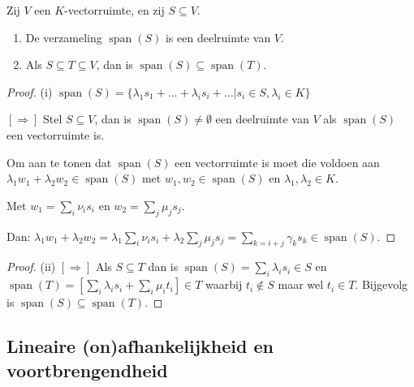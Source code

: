 \begin{lemma}[2.2.9]
    Zij $V$ een $K$-vectorruimte, en zij $S \subseteq V$.
    \begin{enumerate}
        \item[(i)] De verzameling $\operatorname{span}(S)$ is een deelruimte van $V$.
        \item[(ii)] Als $S \subseteq T \subseteq V$, dan is $\operatorname{span}(S) \subseteq \operatorname{span}(T)$.
    \end{enumerate}
\end{lemma}
\begin{proof}(i)
    \(\operatorname{span}(S) = \{\lambda_1s_1+ \dots + \lambda_is_i + \dots |s_i \in S, \lambda_i \in K \}\)

    \([\Rightarrow]\) Stel \(S \subseteq V\), dan is \(\operatorname{span}(S) \neq \emptyset\) een deelruimte van \(V\) als \(\operatorname{span}(S)\) een vectorruimte is.

    Om aan te tonen dat \(\operatorname{span}(S)\) een vectorruimte is moet die voldoen aan \(\lambda_1 w_1 + \lambda_2 w_2 \in \operatorname{span}(S)\) met \(w_1,w_2 \in \operatorname{span}(S) \)
    en \(\lambda_1,\lambda_2 \in K\). 

    Met \(w_1 = \sum_{i} \nu_i s_i\) en \(w_2 = \sum_{j} \mu_j s_j\).

    Dan: 
    \(\lambda_1 w_1 + \lambda_2 w_2 = \lambda_1 \sum_{i} \nu_i s_i + \lambda_2 \sum_{j} \mu_j s_j = \sum_{k=i+j} \gamma_k s_k \in \operatorname{span}(S) \).    
\end{proof}
\begin{proof}(ii)
    \([\Rightarrow]\) Als \(S \subseteq T\) dan is \(\operatorname{span}(S) = \sum_{i} \lambda_i s_i \in S \)
    en \(\operatorname{span}(T) = \left[\sum_{i} \lambda_i s_i + \sum_{i} \mu_i t_i \right] \in T\) 
    waarbij \(t_i \notin S\) maar wel \(t_i \in T\). Bijgevolg is \(\operatorname{span}(S) \subseteq \operatorname{span}(T)\).
\end{proof}

\subsection{Lineaire (on)afhankelijkheid en voortbrengendheid}

